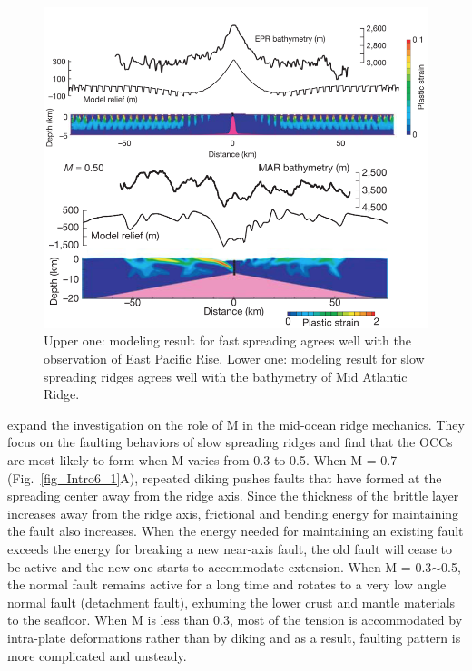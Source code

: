 \begin{figure}[H]
 \centering
  \includegraphics[scale=0.7]{./Figures/fig_Intro5_1.png}
 \caption{\small{Upper one: modeling result for fast spreading agrees well with the observation of East Pacific Rise. Lower one: modeling result for slow spreading ridges agrees well with the bathymetry of Mid Atlantic Ridge. \citep{Buck2005}}}
 \label{fig_Intro5_1}
\end{figure}
\citet{Tucholke2008} expand the investigation on the role of M in the mid-ocean ridge mechanics. They focus on the faulting behaviors of slow spreading ridges and find that the OCCs are most likely to form when M varies from 0.3 to 0.5. When M = 0.7 (Fig.~\ref{fig_Intro6_1}A), repeated diking pushes faults that have formed at the spreading center away from the ridge axis. Since the thickness of the brittle layer increases away from the ridge axis, frictional and bending energy for maintaining the fault also increases. When the energy needed for maintaining an existing fault exceeds the energy for breaking a new near-axis fault, the old fault will cease to be active and the new one starts to accommodate extension. When M = 0.3$\sim$0.5, the normal fault remains active for a long time and rotates to a very low angle normal fault (detachment fault), exhuming the lower crust and mantle materials to the seafloor. When M is less than 0.3, most of the tension is accommodated by intra-plate deformations rather than by diking and as a result, faulting pattern is more complicated and unsteady.

